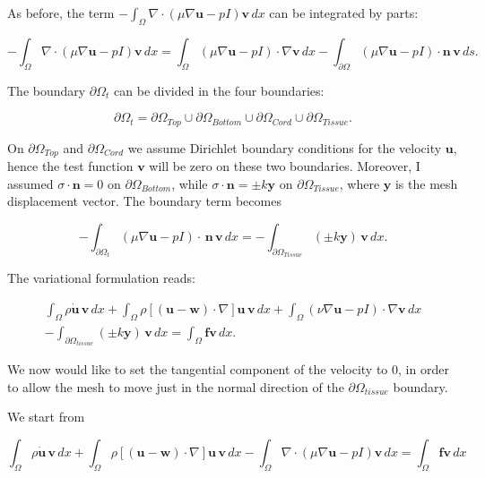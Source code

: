 \documentclass[11pt,a4paper,titlepage]{report}
\begin{document}
As before, the term $- \int_{\Omega} \nabla \cdot (\mu \nabla \mathbf{u} - pI)\mathbf{v} \, dx$ can be integrated by parts:

\[
- \int_{\Omega} \nabla \cdot (\mu \nabla \mathbf{u} - pI)\mathbf{v} \, dx =  \int_{\Omega} (\mu \nabla \mathbf{u} - pI) \cdot \nabla \mathbf{v} \, dx - \int_{\partial \Omega} (\mu \nabla \mathbf{u} - pI) \cdot \mathbf{n} \, \mathbf{v} \, ds.
\]

The boundary $\partial \Omega_t$ can be divided in the four boundaries:

\[
\partial \Omega_t= \partial \Omega_{Top} \cup \partial \Omega_{Bottom} \cup \partial \Omega_{Cord} \cup  \partial \Omega_{Tissue}.
\]

On $\partial \Omega_{Top}$ and $\partial \Omega_{Cord}$ we assume Dirichlet boundary conditions for the velocity $\mathbf{u}$, hence the test function $\mathbf{v}$ will be zero on these two boundaries. Moreover, I assumed $\sigma \cdot \mathbf{n} = 0$ on $\partial \Omega_{Bottom}$, while $\sigma \cdot \mathbf{n} = \pm k \mathbf{y} $ on $\partial \Omega_{Tissue}$, where $\mathbf{y}$ is the mesh displacement vector. The boundary term becomes

\[
- \int_{\partial \Omega_t} (\mu \nabla \mathbf{u} - p I) \cdot \, \mathbf{n} \, \mathbf{v} \, dx = - \int_{\partial \Omega_{Tissue}} (\pm k \mathbf{y}) \, \mathbf{v} \, dx.
\]

The variational formulation reads:

\begin{align*}
\int_{\Omega} \rho \dot{\mathbf{u}} \, \mathbf{v} \, dx
+ \int_{\Omega} \rho [(\mathbf{u - w}) \cdot \nabla] \mathbf{u} \, \mathbf{v} \, dx
+ \int_{\Omega} (\nu \nabla \mathbf{u} - pI) \cdot \nabla \mathbf{v} \, dx \\
- \int_{\partial \Omega_{tissue}} (\pm k \mathbf{y}) \, \mathbf{v} \, dx
=  \int_{\Omega} \mathbf{f} \mathbf{v} \, dx.
\end{align*}

We now would like to set the tangential component of the velocity to $0$, in order to allow the mesh to move just in the normal direction of the $\partial \Omega_{tissue}$ boundary.


We start from 

\[
 \int_{\Omega} \rho \dot{\mathbf{u}} \, \mathbf{v} \, dx
+ \int_{\Omega} \rho [(\mathbf{u - w}) \cdot \nabla] \mathbf{u} \, \mathbf{v} \, dx
- \int_{\Omega} \nabla \cdot (\mu \nabla \mathbf{u} - pI)\mathbf{v} \, dx
= \int_{\Omega} \mathbf{f} \mathbf{v} \, dx
\]
\end{document}
